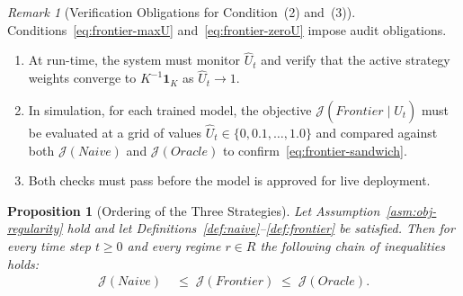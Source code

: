 \documentclass[12pt,openany]{book}
\numberwithin{equation}{chapter}
\theoremstyle{plain}
\newtheorem{proposition}[theorem]{Proposition}
\theoremstyle{definition}
\theoremstyle{remark}
\newtheorem{remark}[theorem]{Remark}
\numberwithin{equation}{chapter}
\theoremstyle{plain}
\newcommand{\Naive}{N}
\newcommand{\Oracle}{O}
\newcommand{\Frontier}{F}
\newcommand{\calR}{\mathcal{R}}
\def\Naive{Naive}%
\def\Oracle{Oracle}%
\def\Frontier{Frontier}%
\def\calR{R}%
\begin{document}
\begin{remark}[Verification Obligations for Condition~(2) and~(3)]
\label{rem:frontier-verify}
Conditions~\eqref{eq:frontier-maxU} and~\eqref{eq:frontier-zeroU}
impose audit obligations.
\begin{enumerate}
  \item At run-time, the system must monitor $\hat{U}_t$ and
        verify that the active strategy weights converge
        to $K^{-1}\mathbf{1}_K$ as $\hat{U}_t \to 1$.
  \item In simulation, for each trained model, the objective
        $\mathcal{J}(\Frontier \mid \hat{U}_t)$ must be
        evaluated at a grid of values
        $\hat{U}_t \in \{0, 0.1, \ldots, 1.0\}$ and compared
        against both $\mathcal{J}(\Naive)$ and
        $\mathcal{J}(\Oracle)$ to confirm~\eqref{eq:frontier-sandwich}.
  \item Both checks must pass before the model is approved for
        live deployment.
\end{enumerate}
\end{remark}

\begin{proposition}[Ordering of the Three Strategies]
\label{prop:order}
Let Assumption~\ref{asm:obj-regularity} hold and let
Definitions~\ref{def:naive}--\ref{def:frontier} be satisfied.
Then for every time step $t \geq 0$ and every regime
$r \in \calR$ the following chain of inequalities holds:
\begin{align}
  \mathcal{J}(\Naive)
  &\;\leq\;
  \mathcal{J}(\Frontier)
  \;\leq\;
  \mathcal{J}(\Oracle).
  \label{eq:order}
\end{align}
\end{proposition}
\end{document}
